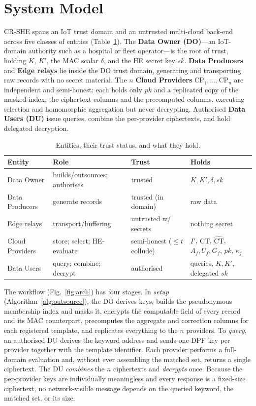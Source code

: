 \documentclass[journal]{IEEEtran}
\begin{document}
\section{System Model}
\label{sec:system}
CR-SHE spans an IoT trust domain and an untrusted multi-cloud back-end across five classes of entities (Table~\ref{tab:entities}). The \textbf{Data Owner (DO)}---an IoT-domain authority such as a hospital or fleet operator---is the root of trust, holding $K$, $K'$, the MAC scalar $\delta$, and the HE secret key $sk$. \textbf{Data Producers} and \textbf{Edge relays} lie inside the DO trust domain, generating and transporting raw records with no secret material. The $n$ \textbf{Cloud Providers} $\text{CP}_1,\dots,\text{CP}_n$ are independent and semi-honest: each holds only $pk$ and a replicated copy of the masked index, the ciphertext columns and the precomputed columns, executing selection and homomorphic aggregation but never decrypting. Authorised \textbf{Data Users (DU)} issue queries, combine the per-provider ciphertexts, and hold delegated decryption.

\begin{table}[t]
\centering
\caption{Entities, their trust status, and what they hold.}
\label{tab:entities}
\footnotesize
\renewcommand{\arraystretch}{1.3}
\begin{tabular}{@{}p{1.75cm}p{1.95cm}p{1.7cm}p{1.85cm}@{}}
\toprule
Entity & Role & Trust & Holds \\
\midrule
Data Owner & builds/outsources; authorises & trusted & $K,K',\delta,sk$ \\
Data Producers & generate records & trusted (in domain) & raw data \\
Edge relays & transport/buffering & untrusted w/ secrets & nothing secret \\
Cloud Providers & store; select; HE-evaluate & semi-honest ($\le t$ collude) & $I'$, $\text{CT}$, $\widehat{\text{CT}}$, $A_f,U_f,G_f$, $pk$, $\kappa_j$ \\
Data Users & query; combine; decrypt & authorised & queries, $K,K'$, delegated $sk$ \\
\bottomrule
\end{tabular}
\end{table}

The workflow (Fig.~\ref{fig:arch}) has four stages. In \emph{setup} (Algorithm~\ref{alg:outsource}), the DO derives keys, builds the pseudonymous membership index and masks it, encrypts the computable field of every record and its MAC counterpart, precomputes the aggregate and correction columns for each registered template, and replicates everything to the $n$ providers. To \emph{query}, an authorised DU derives the keyword address and sends one DPF key per provider together with the template identifier. Each provider performs a full-domain evaluation and, without ever assembling the matched set, returns a single ciphertext. The DU \emph{combines} the $n$ ciphertexts and \emph{decrypts} once. Because the per-provider keys are individually meaningless and every response is a fixed-size ciphertext, no network-visible message depends on the queried keyword, the matched set, or its size.
\end{document}
